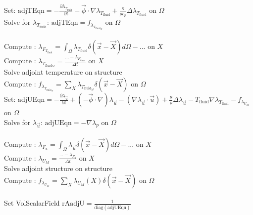 \documentclass[10pt]{article} %
\begin{document}
\begin{center}
	\newpage
\begin{algorithm}[H]
	\SetAlgoLined
	{
		{
			Set: $\text{adjTEqn} = - \frac{\partial \lambda_{T_{\text{fluid}}}}{\partial t} -\vec{\phi} \cdot \nabla \lambda_{T_{\text{fluid}}} + \frac{\kappa}{\rho c_p} \Delta  \lambda_{T_{\text{fluid}}}$ \quad on $\Omega$\\
			Solve for $\lambda_{T_{\text{fluid}}}$: $\text{adjTEqn} = f_{\lambda_{T_{\text{fluid}_M}}} $ \quad on $\Omega$\\
			\quad \\
			Compute : $\lambda_{F_{T_{\text{fluid}}}} = \int_{\Omega} \lambda_{T_{\text{fluid}}} \delta (\vec{x}-\vec{X}) d\Omega - ... $ \quad on $X$\\
			Compute : $\lambda_{T_{\text{fluid}_M}} = \frac{... - \lambda_{F_{T_{\text{fluid}}}}}{\Delta t}$ \quad on $X$\\
			Solve adjoint temperature on structure\\
			Compute : $f_{\lambda_{T_{\text{fluid}_M}}} = \sum_{X} \lambda_{T_{\text{fluid}_M}} \delta (\vec{x}-\vec{X})$ \quad on $\Omega$\\
		}
		{
			Set: $\text{adjUEqn} = -\frac{\partial \lambda_{\vec{u}}}{\partial t} + (-\vec{\phi}\cdot\nabla) \lambda_{\vec{u}} - \left(\nabla \lambda_{\vec{u}} \cdot \vec{u}\right) + \frac{\mu}{\rho} \Delta \lambda_{\vec{u}} - T_{\text{fluid}} \nabla \lambda_{T_{\text{fluid}}} - f_{\lambda_{U_M}}$ \quad on $\Omega$\\
			Solve for $\lambda_{\vec{u}}$: $\text{adjUEqn} = - \nabla\lambda_p $ \quad on $\Omega$\\
			\quad \\
			Compute : $\lambda_{F_u} = \int_{\Omega} \lambda_{\vec{u}} \delta (\vec{x}-\vec{X}) d\Omega - ...$  \quad on $X$\\
			Compute : $\lambda_{U_M} = \frac{...-\lambda_{F_u}}{\Delta t}$ \quad on $X$\\
			Solve adjoint structure on structure\\
			Compute : $f_{\lambda_{U_M}} = \sum_X \lambda_{U_M}(X) \delta(\vec{x}-\vec{X})$ \quad on $\Omega$\\
			\quad \\
			{
				Set VolScalarField $\text{rAadjU} =  \frac{1}{\text{diag}(\text{adjUEqn})}$\\
}}}
\end{algorithm}
\end{center}
\end{document}
